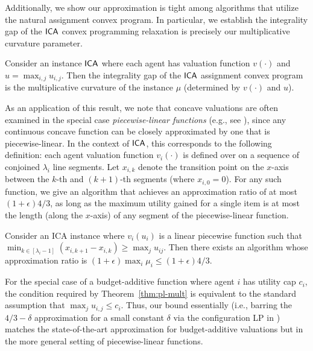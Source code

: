 Additionally, we show our approximation is tight among algorithms that  utilize the natural assignment convex program. 
In particular, we establish the integrality gap of the $\mathsf{ICA}$ convex programming relaxation is precisely our multiplicative curvature parameter.

\begin{theorem}
\label{thm:int-gap}
Consider an instance $\mathsf{ICA}$ where each agent has valuation function $v(\cdot)$ and $u = \max_{i,j}u_{i, j}$. Then the integrality gap of the $\mathsf{ICA}$ assignment convex program is the multiplicative curvature of the instance $\mu$ (determined by $v(\cdot)$ and $u$). 
\end{theorem}

As an application of this result, we note that concave valuations are often examined in the special case {\em piecewise-linear functions} (e.g., see \cite{anari2018nash, chaudhury2018fair, vazirani2011market}), since any continuous concave function can be closely approximated by one that is piecewise-linear. 
In the context of $\mathsf{ICA}$, this corresponds to the following definition: each agent valuation function $v_i(\cdot)$ is defined over on a sequence of conjoined $\lambda_i$ line segments.  %
Let $x_{i,k}$ denote the transition point on the $x$-axis between the $k$-th and $(k+1)$-th segments (where $x_{i,0} = 0$). For any such function, we give an algorithm that achieves an approximation ratio of at most $(1+\epsilon)4/3$, as long as the maximum utility gained for a single item is at most the length (along the $x$-axis) of any segment of the piecewise-linear function.


\begin{theorem} 
\label{thm:pl-mult}
Consider an ICA instance where $v_i(u_i)$ is a linear piecewise function such that $\min_{k \in [\lambda_i-1]}\left(x_{i,k+1} - x_{i,k}\right) \geq \max_{j} u_{ij}$.
Then there exists an algorithm whose approximation ratio is $(1+\epsilon)\max_{i}\mu_i \leq (1+\epsilon)4/3$. 
\end{theorem}

For the special case of a budget-additive function where agent $i$ has utility cap $c_i$, the condition required by Theorem~\ref{thm:pl-mult} is equivalent to the standard assumption that $\max_{j} u_{i,j} \leq c_i$. Thus, our bound essentially (i.e., barring the $4/3 - \delta$ approximation for a small constant $\delta$ via the configuration LP in \cite{kalaitzis2015configuration}) matches the state-of-the-art approximation for budget-additive valuations but in the more general setting of piecewise-linear functions. 

